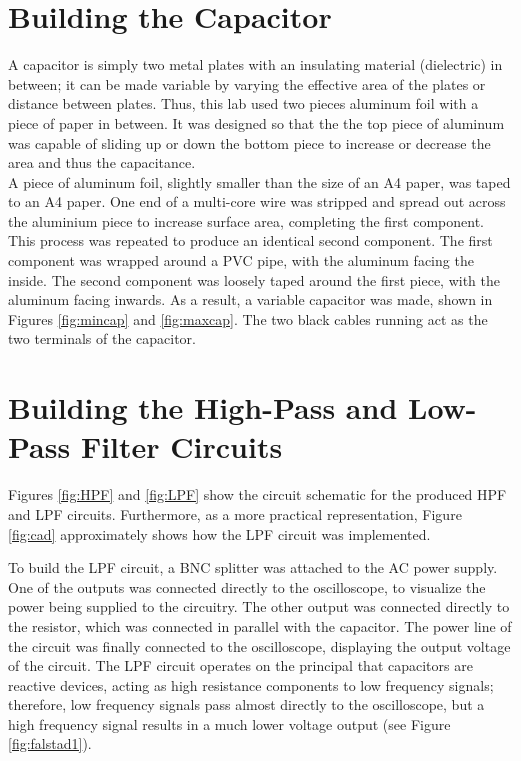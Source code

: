 \documentclass[journal]{IEEEtran}
\begin{document}
\section{Building the Capacitor}

\noindent A capacitor is simply two metal plates with an insulating material (dielectric) in between; it can be made variable by varying the effective area of the plates or distance between plates. Thus, this lab used two pieces aluminum foil with a piece of paper in between. It was designed so that the the top piece of aluminum was capable of sliding up or down the bottom piece to increase or decrease the area and thus the capacitance. \\

\noindent A piece of aluminum foil, slightly smaller than the size of an A4 paper, was taped to an A4 paper. One end of a multi-core wire was stripped and spread out across the aluminium piece to increase surface area, completing the first component. This process was repeated to produce an identical second component. The first component was wrapped around a PVC pipe, with the aluminum facing the inside. The second component was loosely taped around the first piece, with the aluminum facing inwards. As a result, a variable capacitor was made, shown in Figures \ref{fig:mincap} and \ref{fig:maxcap}. The two black cables running act as the two terminals of the capacitor.


\section{Building the High-Pass and Low-Pass Filter Circuits}

\noindent Figures \ref{fig:HPF} and \ref{fig:LPF} show the circuit schematic for the produced HPF and LPF circuits. Furthermore, as a more practical representation, Figure \ref{fig:cad} approximately shows how the LPF circuit was implemented. 



\noindent To build the LPF circuit, a BNC splitter was attached to the AC power supply. One of the outputs was connected directly to the oscilloscope, to visualize the power being supplied to the circuitry. The other output was connected directly to the resistor, which was connected in parallel with the capacitor. The power line of the circuit was finally connected to the oscilloscope, displaying the output voltage of the circuit. The LPF circuit operates on the principal that capacitors are reactive devices, acting as high resistance components to low frequency signals; therefore, low frequency signals pass almost directly to the oscilloscope, but a high frequency signal results in a much lower voltage output (see Figure \ref{fig:falstad1}).
\end{document}
